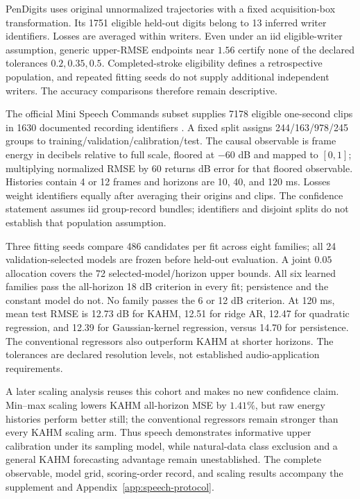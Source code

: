 PenDigits uses original unnormalized trajectories with a fixed acquisition-box
transformation. Its 1751 eligible held-out digits belong to 13 inferred writer
identifiers. Losses are averaged within writers. Even under an iid eligible-writer
assumption, generic upper-RMSE endpoints near $1.56$ certify none of the
declared tolerances $0.2,0.35,0.5$. Completed-stroke eligibility defines a
retrospective population, and repeated fitting seeds do not supply additional
independent writers. The accuracy comparisons therefore remain descriptive.

The official Mini Speech Commands subset supplies 7178 eligible one-second
clips in 1630 documented recording identifiers
\citep{warden2018speech,tensorflow2026mini}. A fixed split assigns
244/163/978/245 groups to training/validation/calibration/test. The causal
observable is frame energy in decibels relative to full scale, floored at
$-60$ dB and mapped to $[0,1]$; multiplying normalized RMSE by 60 returns
dB error for that floored observable. Histories contain 4 or 12 frames and
horizons are 10, 40, and 120 ms. Losses weight identifiers equally after
averaging their origins and clips. The confidence statement assumes iid
group-record bundles; identifiers and disjoint splits do not establish that
population assumption.

Three fitting seeds compare 486 candidates per fit across eight families;
all 24 validation-selected models are frozen before held-out evaluation.
A joint $0.05$ allocation covers the 72 selected-model/horizon upper bounds.
All six learned families pass the all-horizon 18 dB criterion in every fit;
persistence and the constant model do not. No family passes the 6 or 12 dB
criterion. At 120 ms, mean test RMSE is 12.73 dB for KAHM, 12.51 for ridge
AR, 12.47 for quadratic regression, and 12.39 for Gaussian-kernel regression,
versus 14.70 for persistence. The conventional regressors also outperform
KAHM at shorter horizons. The tolerances are declared resolution levels,
not established audio-application requirements.

A later scaling analysis reuses this cohort and makes no new confidence
claim. Min--max scaling lowers KAHM all-horizon MSE by $1.41\%$, but raw
energy histories perform better still; the conventional regressors remain
stronger than every KAHM scaling arm. Thus speech demonstrates informative
upper calibration under its sampling model, while natural-data class exclusion
and a general KAHM forecasting advantage remain unestablished. The complete
observable, model grid, scoring-order record, and scaling results accompany
the supplement and Appendix~\ref{app:speech-protocol}.
